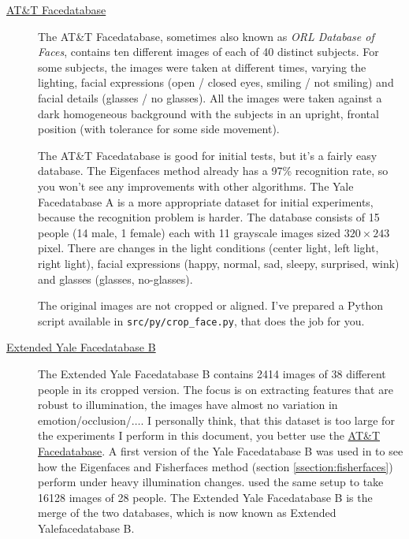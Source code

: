 \begin{description}

	\item[\href{http://www.cl.cam.ac.uk/research/dtg/attarchive/facedatabase.html}{AT\&T Facedatabase}] The AT\&T Facedatabase, sometimes also known as \textit{ORL Database of Faces}, contains ten different images of each of 40 distinct subjects. For some subjects, the images were taken at different times, varying the lighting, facial expressions (open / closed eyes, smiling / not smiling) and facial details (glasses / no glasses). All the images were taken against a dark homogeneous background with the subjects in an upright, frontal position (with tolerance for some side movement).
	
	\item[\href{http://vision.ucsd.edu/content/yale-face-database}] The AT\&T Facedatabase is good for initial tests, but it's a fairly easy database. The Eigenfaces method already has a 97\% recognition rate, so you won't see any improvements with other algorithms. The Yale Facedatabase A is a more appropriate dataset for initial experiments, because the recognition problem is harder. The database consists of 15 people (14 male, 1 female) each with 11 grayscale images sized $320 \times 243$ pixel. There are changes in the light conditions (center light, left light, right light), facial expressions (happy, normal, sad, sleepy, surprised, wink) and glasses (glasses, no-glasses). 
	
The original images are not cropped or aligned. I've prepared a Python script available in \lstinline|src/py/crop_face.py|, that does the job for you.
	
	\item[\href{http://vision.ucsd.edu/~leekc/ExtYaleDatabase/ExtYaleB.html}{Extended Yale Facedatabase B}] The Extended Yale Facedatabase B contains 2414 images of 38 different people in its cropped version. The focus is on extracting features that are robust to illumination, the images have almost no variation in emotion/occlusion/$\ldots$. I personally think, that this dataset is too large for the experiments I perform in this document, you better use the \href{http://www.cl.cam.ac.uk/research/dtg/attarchive/facedatabase.html}{AT\&T Facedatabase}. A first version of the Yale Facedatabase B was used in \cite{belhumeru97} to see how the Eigenfaces and Fisherfaces method (section \ref{ssection:fisherfaces}) perform under heavy illumination changes. \cite{Lee2005} used the same setup to take 16128 images of 28 people. The Extended Yale Facedatabase B is the merge of the two databases, which is now known as Extended Yalefacedatabase B.

\end{description}

